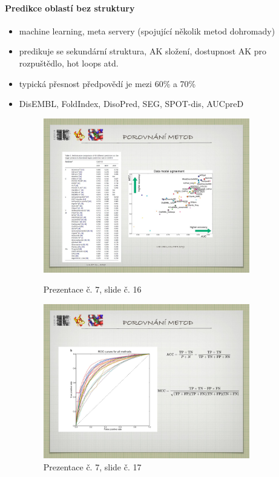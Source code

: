 \documentclass[DIV=8]{scrreprt}
\begin{document}
\paragraph{Predikce oblastí bez struktury}
\begin{itemize}[nosep]
    \item machine learning, meta servery (spojující několik metod dohromady)
    \item predikuje se sekundární struktura, AK složení, dostupnost AK pro rozpuštědlo, hot loops atd.
    \item typická přesnost předpovědí je mezi 60\% a 70\%
    \item DisEMBL, FoldIndex, DisoPred, SEG, SPOT-dis, AUCpreD \begin{figure}
    \caption{Prezentace č. 7, slide č. 16}
    \includegraphics[width=0.85\textwidth]{slides-7/slide-16.jpg}
    \centering
    \label{slides-7-slide-16}
\end{figure}
\begin{figure}
    \caption{Prezentace č. 7, slide č. 17}
    \includegraphics[width=0.85\textwidth]{slides-7/slide-17.jpg}

\end{figure}
\end{itemize}
\end{document}
